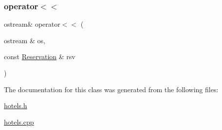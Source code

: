 \subsubsection{\texorpdfstring{operator$<$$<$}{operator<<}}
{\footnotesize\ttfamily ostream\& operator$<$$<$ (\begin{DoxyParamCaption}\item[{ostream \&}]{os,  }\item[{const \hyperlink{class_reservation}{Reservation} \&}]{rsv }\end{DoxyParamCaption})\hspace{0.3cm}{\ttfamily [friend]}}



The documentation for this class was generated from the following files\+:\begin{DoxyCompactItemize}
\item 
\hyperlink{hotels_8h}{hotels.\+h}\item 
\hyperlink{hotels_8cpp}{hotels.\+cpp}\end{DoxyCompactItemize}
